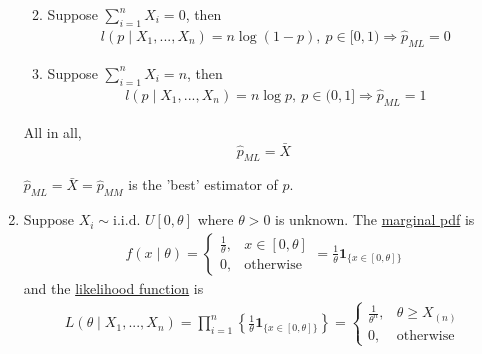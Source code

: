 \documentclass[11pt]{elegantbook}
\begin{document}
\begin{example}
\begin{enumerate}
\begin{enumerate}
\begin{equation}
        \end{equation}
        \item Suppose $\sum_{i=1}^n X_i=0$, then
        \begin{equation}
            \begin{aligned}
                l(p\mid X_1,...,X_n)=n\log (1-p),\ p\in [0,1)
                \Rightarrow \hat{p}_{ML}=0
            \end{aligned}
            \nonumber
        \end{equation}
        \item Suppose $\sum_{i=1}^n X_i=n$, then
        \begin{equation}
            \begin{aligned}
                l(p\mid X_1,...,X_n)=n\log p,\ p\in (0,1]
                \Rightarrow \hat{p}_{ML}=1
            \end{aligned}
            \nonumber
        \end{equation}
    \end{enumerate}
    All in all, $$\hat{p}_{ML}=\bar{X}$$
    \begin{remark}
        $\hat{p}_{ML}=\bar{X}=\hat{p}_{MM}$ is the 'best' estimator of $p$.
    \end{remark}
    \item Suppose $X_i\sim \text{i.i.d. } U[0,\theta]$ where $\theta>0$ is unknown. The \underline{marginal pdf} is
    \begin{equation}
        \begin{aligned}
            f(x\mid \theta)=\left\{\begin{matrix}
                \frac{1}{\theta},&x\in[0,\theta]\\
                0,&\text{otherwise}
            \end{matrix}\right.=\frac{1}{\theta}\mathbf{1}_{\{x\in[0,\theta]\}}
        \end{aligned}
        \nonumber
    \end{equation}
    and the \underline{likelihood function} is
    \begin{equation}
        \begin{aligned}
            L(\theta\mid X_1,...,X_n)
            =\prod_{i=1}^n\left\{ \frac{1}{\theta}\mathbf{1}_{\{x\in[0,\theta]\}}\right\}
            =\left\{\begin{matrix}
                \frac{1}{\theta^n},&\theta\geq X_{(n)}\\
                0,&\text{otherwise}
            \end{matrix}\right.\\

\end{aligned}
\end{equation}
\end{enumerate}
\end{example}
\end{document}
